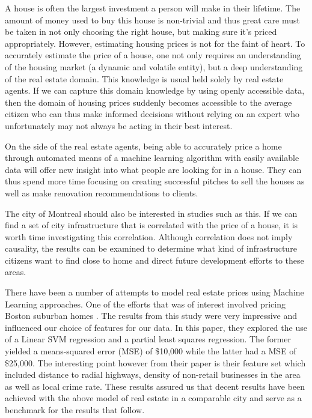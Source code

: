\documentclass{acm_proc_article-sp}
\begin{document}
	A house is often the largest investment a person will make in their lifetime. The amount of money used to buy this house is non-trivial and thus great care must be taken in not only choosing the right house, but making sure it's priced appropriately. However, estimating housing prices is not for the faint of heart. To accurately estimate the price of a house, one not only requires an understanding of the housing market (a dynamic and volatile entity), but a deep understanding of the real estate domain. This knowledge is usual held solely by real estate agents. If we can capture this domain knowledge by using openly accessible data, then the domain of housing prices suddenly becomes accessible to the average citizen who can thus make informed decisions without relying on an expert who unfortunately may not always be acting in their best interest.
	
	On the side of the real estate agents, being able to accurately price a home through automated means of a machine learning algorithm with easily available data will offer new insight into what people are looking for in a house. They can thus spend more time focusing on creating successful pitches to sell the houses as well as make renovation recommendations to clients.
	
	The city of Montreal should also be interested in studies such as this. If we can find a set of city infrastructure that is correlated with the price of a house, it is worth time investigating this correlation. Although correlation does not imply causality, the results can be examined to determine what kind of infrastructure citizens want to find close to home and direct future development efforts to these areas.
	
	There have been a number of attempts to model real estate prices using Machine Learning approaches. One of the efforts that was of interest involved pricing Boston suburban homes \cite{bostonres}. The results from this study were very impressive and influenced our choice of features for our data. In this paper, they explored the use of a Linear SVM regression and a partial least squares regression. The former yielded a means-squared error (MSE) of \$10,000 while the latter had a MSE of \$25,000. The interesting point however from their paper is their feature set which included distance to radial highways, density of non-retail businesses in the area as well as local crime rate. These results assured us that decent results have been achieved with the above model of real estate in a comparable city and serve as a benchmark for the results that follow. 
	
\end{document}
